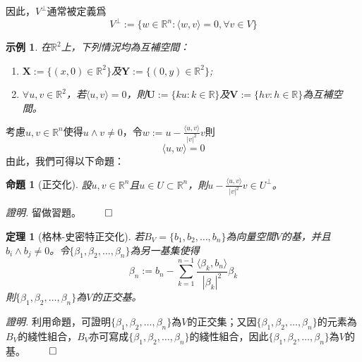 \documentclass[12pt]{article}
\newcommand{\innerprod}[2]{\langle{#1},{#2}\rangle}
\newtheorem*{theorem}{定理}
\newtheorem*{proposition}{命題}
\newtheorem*{example}{示例}
\renewenvironment*{proof}{\textit{證明.}}{\hfill$\qed$}
\begin{document}
    因此，$V^{\perp}$通常被定義爲$$V^{\perp}:=\{w\in\mathbb{R}^n:\innerprod{w}{v}=0, \forall v\in V\}$$

    \begin{example}
        在$\mathbb{R}^2$上，下列情況均為互補空間：\begin{enumerate}
            \item $\mathbf{X}:=\{(x,0)\in\mathbb{R}^2\}$及$\mathbf{Y}:=\{(0,y)\in\mathbb{R}^2\}$;
            \item $\forall u,v \in\mathbb{R}^2$，若$\innerprod{u}{v}=0$，則$\mathbf{U}:=\{ku:k\in\mathbb{R}\}$及$\mathbf{V}:=\{hv:h\in\mathbb{R}\}$為互補空間。
        \end{enumerate}
    \end{example}

    考慮$u,v\in\mathbb{R}^n$使得$u\wedge v\neq 0$，令$w:=u-\frac{\innerprod{u}{v}}{|v|^2}v$則$$\innerprod{u}{w}=0$$由此，我們可得以下命題：

    \begin{proposition}[正交化]
        設$u,v\in \mathbb{R}^n$且$u\in U\subset \mathbb{R}^n$，則$u-\frac{\innerprod{u}{v}}{|v|^2}v\in U^{\perp}$。
    \end{proposition}

    \begin{proof}
        留做習題。
    \end{proof}

    \begin{theorem}[格林-史密特正交化]
        若$B_V=\{b_1,b_2,\dots,b_n\}$為向量空間$V$的基，并且$b_i\wedge b_j\neq 0$。令$\{\beta_1,\beta_2,\dots,\beta_n\}$為另一基集使得$$\beta_n:=b_n-\sum_{k=1}^{n-1}\frac{\innerprod{\beta_k}{b_n}}{|\beta_k|^2}\beta_k$$則$\{\beta_1,\beta_2,\dots,\beta_n\}$為$V$的正交基。
    \end{theorem}

    \begin{proof}
        利用命題，可證明$\{\beta_1,\beta_2,\dots,\beta_n\}$為$V$的正交集；又因$\{\beta_1,\beta_2,\dots,\beta_n\}$的元素為$B_V$的綫性組合，$B_V$亦可寫成$\{\beta_1,\beta_2,\dots,\beta_n\}$的綫性組合，因此$\{\beta_1,\beta_2,\dots,\beta_n\}$為$V$的基。
    \end{proof}
\end{document}
